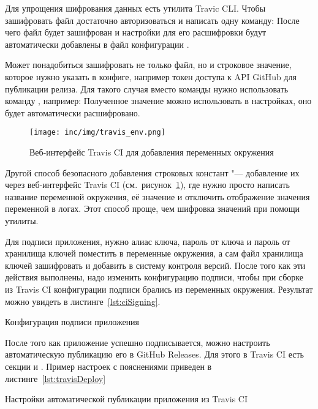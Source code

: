 Для упрощения шифрования данных есть утилита Travic CLI\@.
Чтобы зашифровать файл достаточно авторизоваться и написать одну команду:
После чего файл будет зашифрован и настройки для его расшифровки будут автоматически добавлены в файл конфигурации .

Может понадобиться зашифровать не только файл, но и строковое значение, которое нужно указать в конфиге, например токен доступа к API GitHub для публикации релиза.
Для такого случая вместо команды  нужно использовать команду , например:
Полученное значение можно использовать в настройках, оно будет автоматически расшифровано.

\begin{figure}[ht]
  \centering
  \texttt{[image: inc/img/travis\_env.png]}
  \caption{Веб-интерфейс Travis CI для добавления переменных окружения}
  \label{fig:travisEnv}
\end{figure}

Другой способ безопасного добавления строковых констант "--- добавление их через веб-интерфейс Travis CI (см.~рисунок~\ref{fig:travisEnv}), где нужно просто написать название переменной окружения, её значение и отключить отображение значения переменной в логах.
Этот способ проще, чем шифровка значений при помощи утилиты.

Для подписи приложения, нужно алиас ключа, пароль от ключа и пароль от хранилища ключей поместить в переменные окружения, а сам файл хранилища ключей зашифровать и добавить в систему контроля версий.
После того как эти действия выполнены, надо изменить конфигурацию подписи, чтобы при сборке из Travis CI конфигурации подписи брались из переменных окружения.
Результат можно увидеть в листинге~\ref{lst:ciSigning}.

\begin{listing}[h]
  \caption{Конфигурация подписи приложения}
  \label{lst:ciSigning}
\end{listing}

После того как приложение успешно подписывается, можно настроить автоматическую публикацию его в GitHub Releases.
Для этого в Travis CI есть секции  и .
Пример настроек с пояснениями приведен в листинге~\ref{lst:travisDeploy}

\begin{listing}[h]
  \caption{Настройки автоматической публикации приложения из Travis CI}
  \label{lst:travisDeploy}
\end{listing}

